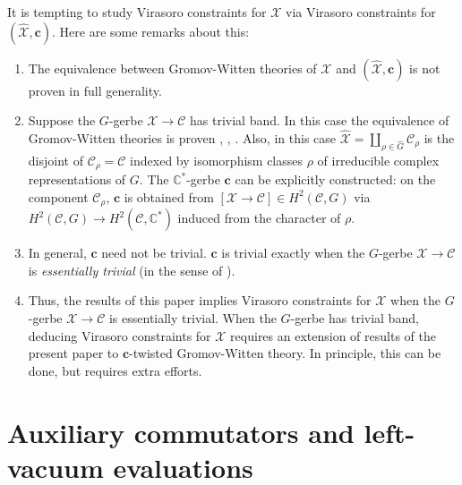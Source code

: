 \documentclass[letterpaper,12pt]{amsart}
\theoremstyle{definition}
\numberwithin{equation}{section}
\begin{document}
It is tempting to study Virasoro constraints for $\mathcal{X}$ via Virasoro constraints for $(\widehat{\mathcal{X}},\mathbf{c})$. Here are some remarks about this:
\begin{enumerate}
\item The equivalence between Gromov-Witten theories of $\mathcal{X}$ and $(\widehat{\mathcal{X}},\mathbf{c})$ is not proven in full generality.

\item Suppose the $G$-gerbe $\mathcal{X}\to \mathcal{C}$ has trivial band. In this case the equivalence of Gromov-Witten theories is proven \cite{AJT}, \cite{AJT2}, \cite{TT2}. Also, in this case $\widehat{\mathcal{X}}=\coprod_{\rho\in \hat{G}}\mathcal{C}_{\rho}$ is the disjoint of $\mathcal{C}_\rho=\mathcal{C}$ indexed by isomorphism classes $\rho$ of irreducible complex representations of $G$. The $\mathbb{C}^*$-gerbe $\mathbf{c}$ can be explicitly constructed: on the component $\mathcal{C}_\rho$, $\mathbf{c}$ is obtained from $[\mathcal{X}\to\mathcal{C}]\in H^2(\mathcal{C},G)$ via $H^2(\mathcal{C},G)\to H^2(\mathcal{C},\mathbb{C}^*)$ induced from the character of $\rho$.

\item In general, $\mathbf{c}$ need not be trivial. $\mathbf{c}$ is trivial exactly when the $G$-gerbe $\mathcal{X}\to\mathcal{C}$ is {\em essentially trivial} (in the sense of \cite{FMN}). 

\item Thus, the results of this paper implies Virasoro constraints for $\mathcal{X}$ when the $G$-gerbe $\mathcal{X}\to\mathcal{C}$ is essentially trivial. When the $G$-gerbe has trivial band, deducing Virasoro constraints for $\mathcal{X}$ requires an extension of results of the present paper to $\mathbf{c}$-twisted Gromov-Witten theory. In principle, this can be done, but requires extra efforts.

    
\end{enumerate}

\appendix


\section{Auxiliary commutators and left-vacuum evaluations}
\label{app:vacuum}
\end{document}
